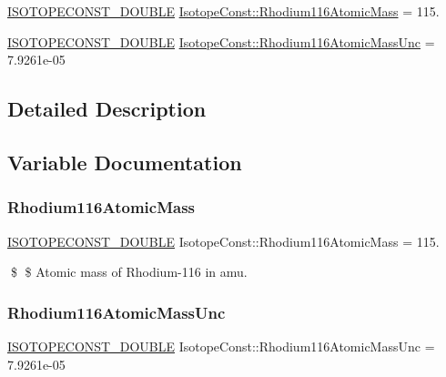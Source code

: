 \begin{DoxyCompactItemize}
\item 
\mbox{\hyperlink{group___isotope_const-_macros_ga8f45a7272ce02c0b4c65c44636ed719a}{I\+S\+O\+T\+O\+P\+E\+C\+O\+N\+S\+T\+\_\+\+D\+O\+U\+B\+LE}} \mbox{\hyperlink{group___isotope_const-_rhodium-_rh116_gae8a918e3e2fd3957c0630bea3e9a52b6}{Isotope\+Const\+::\+Rhodium116\+Atomic\+Mass}} = 115.
\item 
\mbox{\hyperlink{group___isotope_const-_macros_ga8f45a7272ce02c0b4c65c44636ed719a}{I\+S\+O\+T\+O\+P\+E\+C\+O\+N\+S\+T\+\_\+\+D\+O\+U\+B\+LE}} \mbox{\hyperlink{group___isotope_const-_rhodium-_rh116_gad5b1ea936671cccfc25caf7f1eb171d0}{Isotope\+Const\+::\+Rhodium116\+Atomic\+Mass\+Unc}} = 7.\+9261e-\/05
\end{DoxyCompactItemize}


\subsection{Detailed Description}


\subsection{Variable Documentation}
\mbox{\label{group___isotope_const-_rhodium-_rh116_gae8a918e3e2fd3957c0630bea3e9a52b6}} 
\subsubsection{\texorpdfstring{Rhodium116\+Atomic\+Mass}{Rhodium116AtomicMass}}
{\footnotesize\ttfamily \mbox{\hyperlink{group___isotope_const-_macros_ga8f45a7272ce02c0b4c65c44636ed719a}{I\+S\+O\+T\+O\+P\+E\+C\+O\+N\+S\+T\+\_\+\+D\+O\+U\+B\+LE}} Isotope\+Const\+::\+Rhodium116\+Atomic\+Mass = 115.}

\$ \$ Atomic mass of Rhodium-\/116 in amu. \mbox{\label{group___isotope_const-_rhodium-_rh116_gad5b1ea936671cccfc25caf7f1eb171d0}} 
\subsubsection{\texorpdfstring{Rhodium116\+Atomic\+Mass\+Unc}{Rhodium116AtomicMassUnc}}
{\footnotesize\ttfamily \mbox{\hyperlink{group___isotope_const-_macros_ga8f45a7272ce02c0b4c65c44636ed719a}{I\+S\+O\+T\+O\+P\+E\+C\+O\+N\+S\+T\+\_\+\+D\+O\+U\+B\+LE}} Isotope\+Const\+::\+Rhodium116\+Atomic\+Mass\+Unc = 7.\+9261e-\/05}

